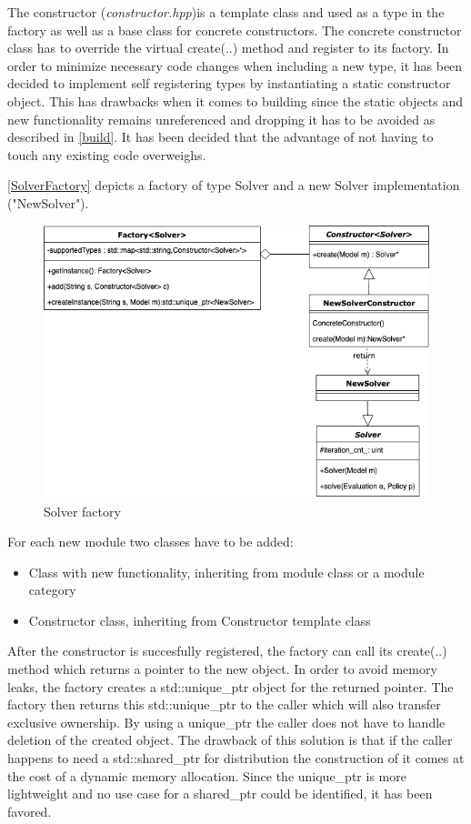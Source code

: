 The constructor (\emph{constructor.hpp})is a template class and used as a type in the factory as well as a base class for concrete constructors. The concrete constructor class has to override the virtual create(..) method and register to its factory.
In order to minimize necessary code changes when including a new type, it has been decided to implement self registering types by instantiating a static constructor object. This has drawbacks when it comes to building since the static objects and new functionality remains unreferenced and dropping it has to be avoided as described in \autoref{build}. 
It has been decided that the advantage of not having to touch any existing code overweighs. 

\autoref{SolverFactory} depicts a factory of type Solver and a new Solver implementation ("NewSolver"). 

\begin{figure}[ht]
	\centering
	\includegraphics[width=.8\textwidth]{images/SolverFactory.png}
	\caption{\label{fig:bild2}Solver factory}
	\label{SolverFactory}
\end{figure}

For each new module two classes have to be added:

\begin{itemize}
	\item Class with new functionality, inheriting from module class or a module category
	\item Constructor class, inheriting from Constructor template class
\end{itemize}

After the constructor is succesfully registered, the factory can call its create(..) method which returns a pointer to the new object. In order to avoid memory leaks, the factory creates a std::unique\_ptr object for the returned pointer. The factory then returns this std::unique\_ptr to the caller which will also transfer exclusive ownership. By using a unique\_ptr the caller does not have to handle deletion of the created object. The drawback of this solution is that if the caller happens to need a std::shared\_ptr for distribution the construction of it comes at the cost of a dynamic memory allocation. 
Since the unique\_ptr is more lightweight and no use case for a shared\_ptr could be identified, it has been favored. 

